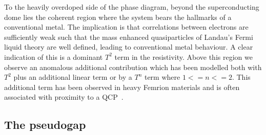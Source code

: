 To the heavily overdoped side of the phase diagram, beyond the superconducting dome lies the coherent region where the system bears the hallmarks of a conventional metal. The implication is that correlations between electrons are sufficiently weak such that the mass enhanced quasiparticles of Landau's Fermi liquid theory are well defined, leading to conventional metal behaviour. A clear indication of this is a dominant $T^2$ term in the resistivity. Above this region we observe an anomalous additional contribution which has been modelled both with $T^2$ plus an additional linear term or by a $T^n$ term where $1 <= n <= 2$. This additional term has been observed in heavy Femrion materials and is often associated with proximity to a \ac{QCP}~\cite{Custers2003}.

\subsection{The pseudogap}

